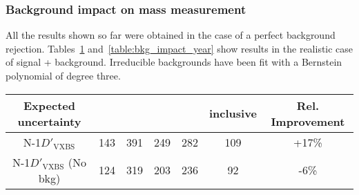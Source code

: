 \subsubsection{Background impact on mass measurement}
All the results shown so far were obtained in the case of a perfect background rejection. 
Tables~\ref{table:bkg_impact} and~\ref{table:bkg_impact_year} show results in the 
realistic case of signal + background. 
Irreducible backgrounds have been fit with a Bernstein polynomial of degree three.
\begin{table}[ht]	
\begin{center}
	\begin{tabular}{ccccccc}
		\hline			
	Expected uncertainty	&	\fourmu	&	\foure	&	\twoetwomu	&\twomutwoe	& inclusive	&	Rel. Improvement \\
		\hline			
		N-1$D'_\text{VXBS}$	&	143	&	391	&	249	&	282	&	109	&	+17\%	\\
		N-1$D'_\text{VXBS}$ (No bkg)	&	124	&	319	&	203	&	236	&	92	&	-6\%	\\
		\hline
	\end{tabular}
	\label{table:bkg_impact}
\end{center}
\end{table}
